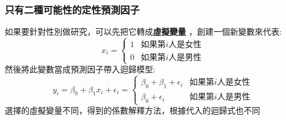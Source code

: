 \documentclass{report} %
\begin{document}
      \subsubsection{只有二種可能性的定性預測因子}
        如果要針對性別做研究，可以先把它轉成{\bf 虛擬變量}
          ，創建一個新變數來代表:
        \begin{equation}
          x_i =
          \left\{
            \begin{array}{ll}
              1 & \mbox{如果第$i$人是女性} \\
              0 & \mbox{如果第$i$人是男性}
            \end{array}
          \right.
        \end{equation}
        然後將此變數當成預測因子帶入迴歸模型:
        \begin{equation}
          y_i = \beta_0 + \beta_1 x_i + \epsilon_i =
          \left\{
            \begin{array}{ll}
              \beta_0 + \beta_1 + \epsilon_i & \mbox{如果第$i$人是女性}
                \\
              \beta_0 + \epsilon_i           & \mbox{如果第$i$人是男性}
            \end{array}
          \right.
        \end{equation}
        選擇的虛擬變量不同，得到的係數解釋方法，根據代入的迴歸式也不同
\end{document}
